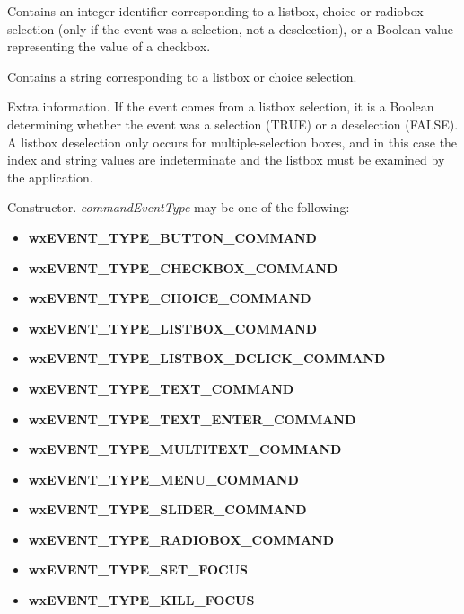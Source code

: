

Contains an integer identifier corresponding to a listbox, choice or
radiobox selection (only if the event was a selection, not a
deselection), or a Boolean value representing the value of a checkbox.



Contains a string corresponding to a listbox or choice selection.



Extra information. If the event comes from a listbox selection, it is
a Boolean determining whether the event was a selection (TRUE) or a
deselection (FALSE). A listbox deselection only occurs for
multiple-selection boxes, and in this case the index and string values
are indeterminate and the listbox must be examined by the application.



Constructor. {\it commandEventType} may be one of the following:

\begin{itemize}\itemsep=0pt
\item {\bf wxEVENT\_TYPE\_BUTTON\_COMMAND}
\item {\bf wxEVENT\_TYPE\_CHECKBOX\_COMMAND}
\item {\bf wxEVENT\_TYPE\_CHOICE\_COMMAND}
\item {\bf wxEVENT\_TYPE\_LISTBOX\_COMMAND}
\item {\bf wxEVENT\_TYPE\_LISTBOX\_DCLICK\_COMMAND}
\item {\bf wxEVENT\_TYPE\_TEXT\_COMMAND}
\item {\bf wxEVENT\_TYPE\_TEXT\_ENTER\_COMMAND}
\item {\bf wxEVENT\_TYPE\_MULTITEXT\_COMMAND}
\item {\bf wxEVENT\_TYPE\_MENU\_COMMAND}
\item {\bf wxEVENT\_TYPE\_SLIDER\_COMMAND}
\item {\bf wxEVENT\_TYPE\_RADIOBOX\_COMMAND}
\item {\bf wxEVENT\_TYPE\_SET\_FOCUS}
\item {\bf wxEVENT\_TYPE\_KILL\_FOCUS}
\end{itemize}

